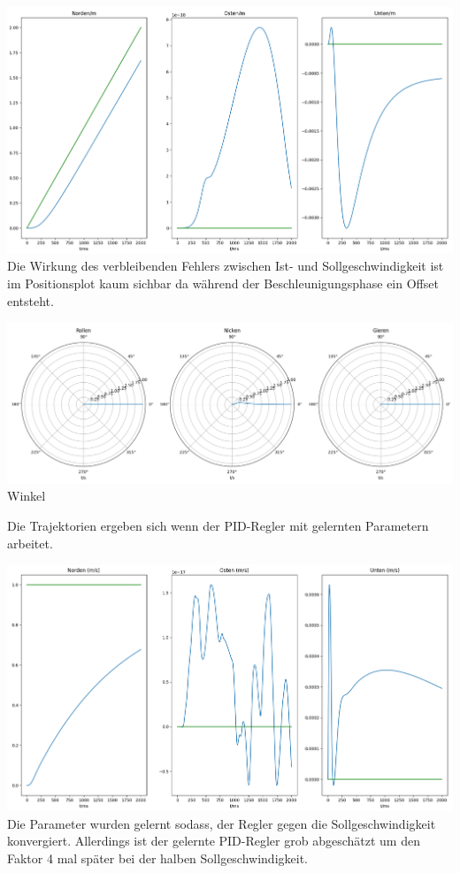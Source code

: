 \begin{center}
	\includegraphics[scale=0.25]{../images/0098 Position.png}{\\Die Wirkung des verbleibenden Fehlers zwischen Ist- und Sollgeschwindigkeit ist im Positionsplot kaum sichbar da während der Beschleunigungsphase ein Offset entsteht.}
\end{center}
\begin{center}
	\includegraphics[scale=0.25]{../images/0097 Drehlage.png}{\\Winkel}
\end{center}
\pagebreak
Die Trajektorien ergeben sich wenn der PID-Regler mit gelernten Parametern arbeitet.
\begin{center}
	\includegraphics[scale=0.25]{../images/0093 Geschwindigkeit.png}{\\Die Parameter wurden gelernt sodass, der Regler gegen die Sollgeschwindigkeit konvergiert. Allerdings ist der gelernte PID-Regler grob abgeschätzt um den Faktor 4 mal später bei der halben Sollgeschwindigkeit.}
\end{center}
